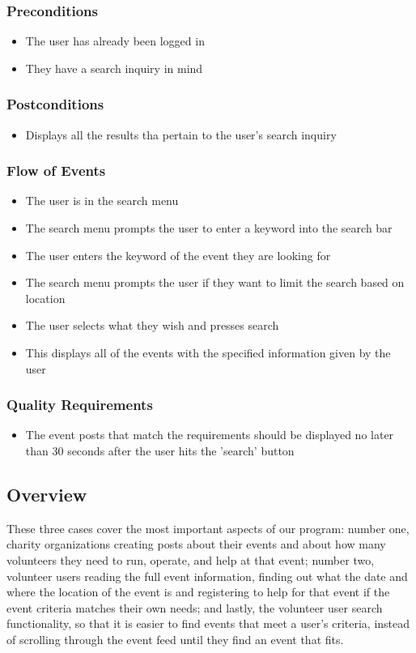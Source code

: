 \documentclass[12pt]{article}
\begin{document}
\subsubsection{Preconditions}
\begin{itemize}
\item
	The user has already been logged in
\item
	They have a search inquiry in mind
\end{itemize}
\subsubsection{Postconditions}
\begin{itemize}
\item
	Displays all the results tha pertain to the user's search inquiry
\end{itemize}
\subsubsection{Flow of Events}
\begin{itemize}
\item
	The user is in the search menu
\item
	The search menu prompts the user to enter a keyword into the search bar
\item
	The user enters the keyword of the event they are looking for
\item
	The search menu prompts the user if they want to limit the search based on
	location
\item
	The user selects what they wish and presses search
\item
	This displays all of the events with the specified information given by the user
\end{itemize}
\subsubsection{Quality Requirements}
\begin{itemize}
\item
	The event posts that match the requirements should be displayed no later than 30
	seconds after the user hits the 'search' button
\end{itemize}
\subsection{Overview}
These three cases cover the most important aspects of our program: number one, charity
organizations creating posts about their events and about how many volunteers they need to
run, operate, and help at that event; number two, volunteer users reading the full event
information, finding out what the date and where the location of the event is and
registering to help for that event if the event criteria matches their own needs; and
lastly, the volunteer user search functionality, so that it is easier to find events that
meet a user's criteria, instead of scrolling through the event feed until they find an
event that fits.
\end{document}
